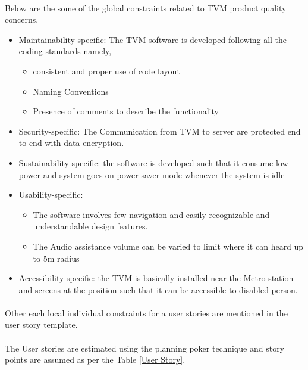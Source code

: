 \documentclass[12pt]{report}
\begin{document}
\paragraph{} Below are the some of the global constraints related to TVM product quality concerns.
\begin{itemize}
    \item Maintainability specific: The TVM software is developed following all the coding standards namely,
    \begin{itemize}
\item consistent and proper use of code layout
\item Naming Conventions
\item Presence of comments to describe the functionality
    \end{itemize}
    \item Security-specific: The Communication from TVM to server are protected end to end with data encryption.
    \item Sustainability-specific: the software is developed such that it consume low power and system goes on power saver mode whenever the system is idle
    \item Usability-specific:
    \begin{itemize}
        \item The software involves few navigation and easily recognizable and understandable design features.  
        \item The Audio assistance volume can be varied to limit where it can heard up to 5m radius
    \end{itemize}
    \item Accessibility-specific: the TVM is basically installed near the Metro station and screens at the position such that it can be accessible to disabled person.
\end{itemize}

\paragraph{}Other each local individual constraints for a user stories are mentioned in the user story template.

\paragraph{} The User stories are estimated using the planning poker technique and story points are assumed as per the Table \ref{User Story}.
\end{document}
